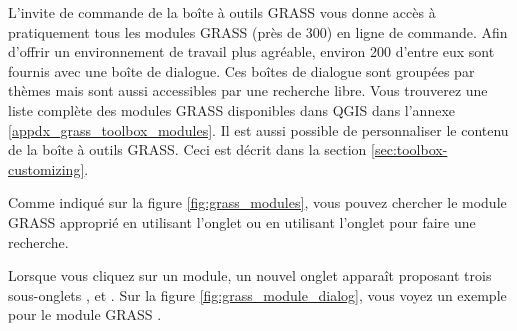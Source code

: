 L'invite de commande de la boîte à outils GRASS vous donne accès à pratiquement tous les modules GRASS (près de 300) en ligne de commande. Afin d'offrir un environnement de travail plus agréable, environ 200 d'entre eux sont fournis avec une boîte de dialogue. Ces boîtes de dialogue sont groupées par thèmes mais sont aussi accessibles par une recherche libre. Vous trouverez une liste complète des modules GRASS disponibles dans QGIS \CURRENT dans l'annexe \ref{appdx_grass_toolbox_modules}. Il est aussi possible de personnaliser le contenu de la boîte à outils GRASS. Ceci est décrit dans la section \ref{sec:toolbox-customizing}.

Comme indiqué sur la figure \ref{fig:grass_modules}, vous pouvez chercher le module GRASS approprié en utilisant l'onglet  ou en utilisant l'onglet  pour faire une recherche.

Lorsque vous cliquez sur un module, un nouvel onglet apparaît proposant trois sous-onglets ,  et . Sur la figure \ref{fig:grass_module_dialog}, vous voyez un exemple pour le module GRASS .

